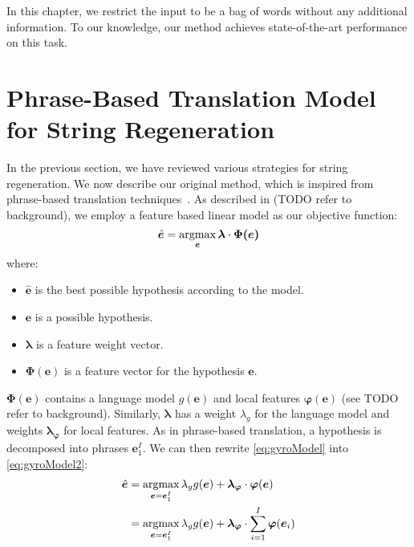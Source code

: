 In this chapter, we restrict the input to be a bag of words without any additional
information. To our knowledge, our method achieves state-of-the-art performance
on this task.


\section{Phrase-Based Translation Model for String Regeneration}

In the previous section, we have reviewed various strategies for string
regeneration. We now describe our original method, which is inspired from
phrase-based translation techniques~\citep{koehn:2010:book}. As described
in (TODO refer to background), we employ a feature based linear model as our
objective function:
%
\begin{equation}
  \hat{\bm{e}} = \operatorname*{argmax}_{\bm{e}} \bm{\lambda} \cdot \bm{\Phi(\bm{e})}
  \label{eq:gyroModel}
\end{equation}
%
where:
%
\begin{itemize}
  \item $\hat{\bm{e}}$ is the best possible hypothesis according to the model.
  \item $\bm{e}$ is a possible hypothesis.
  \item $\bm{\lambda}$ is a feature weight vector.
  \item $\bm{\Phi}(\bm{e})$ is a feature vector for the hypothesis $\bm{e}$.
\end{itemize}
%
$\bm{\Phi}(\bm{e})$ contains a language model
$g(\bm{e})$ and local features $\bm{\varphi}(\bm{e})$ (see TODO refer
to background). Similarly, $\bm{\lambda}$ has a weight $\lambda_g$ for the language model
and weights $\bm{\lambda_{\varphi}}$ for local features. As in phrase-based
translation, a hypothesis
is decomposed into phrases $\bm{e}_1^I$. We can then rewrite
\autoref{eq:gyroModel} into \autoref{eq:gyroModel2}:
%
\begin{equation}
  \begin{split}
    \hat{\bm{e}} &= \operatorname*{argmax}_{\bm{e} = \bm{e}_1^I} \lambda_{g} g(\bm{e}) + \bm{\lambda_{\varphi}} \cdot \bm{\varphi}(\bm{e}) \\
                 &= \operatorname*{argmax}_{\bm{e} = \bm{e}_1^I} \lambda_{g} g(\bm{e}) + \bm{\lambda_{\varphi}} \cdot \sum_{i = 1}^I \bm{\varphi}(\bm{e}_i) \\
  \end{split}
  \label{eq:gyroModel2}
\end{equation}
